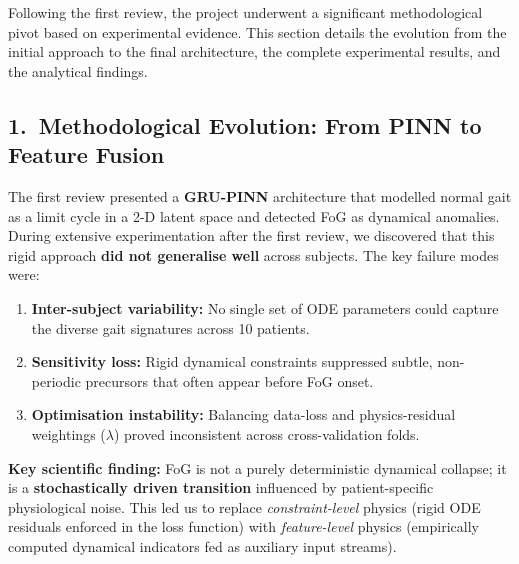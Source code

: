 \documentclass[12pt,a4paper]{article}
\begin{document}
Following the first review, the project underwent a significant methodological pivot based on
experimental evidence. This section details the evolution from the initial approach to the final
architecture, the complete experimental results, and the analytical findings.

\subsection*{1.\ Methodological Evolution: From PINN to Feature Fusion}

The first review presented a \textbf{GRU-PINN} architecture that modelled normal
gait as a limit cycle in a 2-D latent space and detected FoG as dynamical anomalies. During
extensive experimentation after the first review, we discovered that this rigid approach
\textbf{did not generalise well} across subjects. The key failure modes were:

\begin{enumerate}[leftmargin=*, itemsep=4pt]
  \item \textbf{Inter-subject variability:} No single set of ODE parameters could capture the
        diverse gait signatures across 10 patients.
  \item \textbf{Sensitivity loss:} Rigid dynamical constraints suppressed subtle, non-periodic
        precursors that often appear before FoG onset.
  \item \textbf{Optimisation instability:} Balancing data-loss and physics-residual weightings
        ($\lambda$) proved inconsistent across cross-validation folds.
\end{enumerate}

\vspace{4pt}

\noindent\textbf{Key scientific finding:} FoG is not a purely deterministic dynamical collapse;
it is a \textbf{stochastically driven transition} influenced by patient-specific physiological
noise. This led us to replace \emph{constraint-level} physics (rigid ODE residuals enforced in
the loss function) with \emph{feature-level} physics (empirically computed dynamical indicators
fed as auxiliary input streams).
\end{document}
